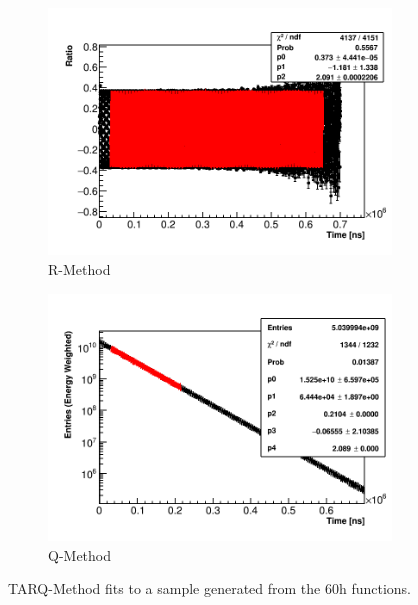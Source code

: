 \begin{figure}[]
    \begin{subfigure}[t]{0.45\textwidth}
        \centering
        \includegraphics[width=\textwidth]{Example_RMethod_Fit}
        \caption{R-Method}
    \end{subfigure}
    \hspace{1mm}
    \begin{subfigure}[t]{0.45\textwidth}
        \centering
        \includegraphics[width=\textwidth]{Example_QMethod_Fit}
        \caption{Q-Method}
    \end{subfigure}
\caption[]{TARQ-Method fits to a sample generated from the 60h functions.}
\label{fig:sampleFits}
\end{figure}


